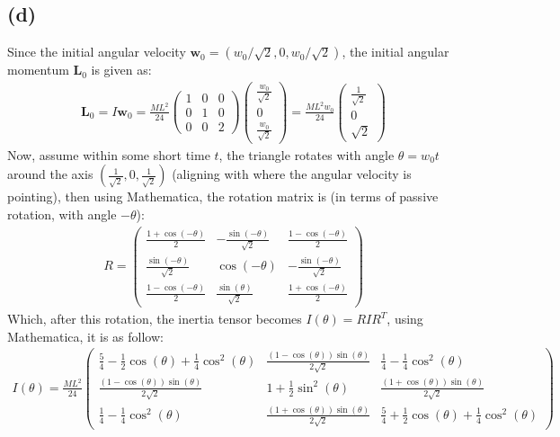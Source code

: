 \documentclass{article}
\newcommand{\bL}{\textbf{L}} %
\newcommand{\bw}{\textbf{w}} %
\begin{document}
\subsection*{(d)}
Since the initial angular velocity $\bw_0 = (w_0/\sqrt{2},0,w_0/\sqrt{2})$, the initial angular momentum $\bL_0$ is given as:
\begin{align}
    \bL_0 = I\bw_0 = \frac{ML^2}{24}\begin{pmatrix}
        1&0&0\\ 0&1&0\\ 0&0&2
    \end{pmatrix}\begin{pmatrix}
        \frac{w_0}{\sqrt{2}} \\ 0\\\frac{w_0}{\sqrt{2}}
    \end{pmatrix} = \frac{ML^2w_0}{24}\begin{pmatrix}
        \frac{1}{\sqrt{2}} \\ 0 \\ \sqrt{2}
    \end{pmatrix}
\end{align}
Now, assume within some short time $t$, the triangle rotates with angle $\theta = w_0t$ around the axis $(\frac{1}{\sqrt{2}},0,\frac{1}{\sqrt{2}})$ (aligning with where the angular velocity is pointing), then using Mathematica, the rotation matrix is (in terms of passive rotation, with angle $-\theta$):
\begin{align}
    R=\begin{pmatrix}
        \frac{1+\cos(-\theta)}{2} & -\frac{\sin(-\theta)}{\sqrt{2}} & \frac{1-\cos(-\theta)}{2}\\
        \frac{\sin(-\theta)}{\sqrt{2}} & \cos(-\theta) & -\frac{\sin(-\theta)}{\sqrt{2}}\\
        \frac{1-\cos(-\theta)}{2} & \frac{\sin(\theta)}{\sqrt{2}} & \frac{1+\cos(-\theta)}{2}
    \end{pmatrix}
\end{align}
Which, after this rotation, the inertia tensor becomes $I(\theta)=RIR^T$, using Mathematica, it is as follow:
\begin{align}
    I(\theta)=\frac{ML^2}{24}\begin{pmatrix}
        \frac{5}{4}-\frac{1}{2}\cos(\theta)+\frac{1}{4}\cos^2(\theta)&\frac{(1-\cos(\theta))\sin(\theta)}{2\sqrt{2}}&\frac{1}{4}-\frac{1}{4}\cos^2(\theta)\\
        \frac{(1-\cos(\theta))\sin(\theta)}{2\sqrt{2}}&1+\frac{1}{2}\sin^2(\theta)&\frac{(1+\cos(\theta))\sin(\theta)}{2\sqrt{2}}\\
        \frac{1}{4}-\frac{1}{4}\cos^2(\theta)&\frac{(1+\cos(\theta))\sin(\theta)}{2\sqrt{2}}&\frac{5}{4}+\frac{1}{2}\cos(\theta)+\frac{1}{4}\cos^2(\theta)
    \end{pmatrix}
\end{align}
\end{document}

